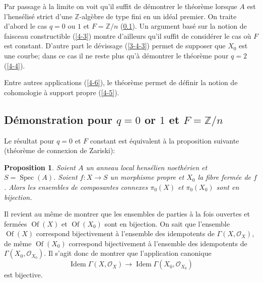 \documentclass{article}
\DeclareMathOperator{\spec}{Spec}
\newcommand{\cO}{\mathcal{O}}
\newcommand{\dZ}{\mathbb{Z}}
\newtheorem{proposition}[subsubsection]{Proposition}
\begin{document}
Par passage à la limite on voit qu'il suffit de démontrer le théorème 
lorsque $A$ est l'hensélisé strict d'une $\dZ$-algèbre  de type fini en 
un idéal premier. On traite d'abord le cas $q=0$ ou $1$ et $F=\dZ/n$ 
(\ref{4-2}). Un argument basé sur la notion de faisceau constructible 
(\ref{4-3}) montre d'ailleurs qu'il suffit de considérer le cas où $F$ est 
constant. D'autre part le dévissage (\ref{3-4-3}) permet de supposer que 
$X_0$ est une courbe; dans ce cas il ne reste plus qu'à démontrer le 
théorème pour $q=2$ (\ref{4-4}). 

Entre autres applications (\ref{4-6}), le théorème permet de définir la notion 
de cohomologie à support propre (\ref{4-5}). 










\subsection{Démonstration pour \texorpdfstring{$q=0$}{q=1} or \texorpdfstring{$1$}{1} et \texorpdfstring{$F=\dZ/n$}{F=Z/n}}\label{4-2} 

Le résultat pour $q=0$ et $F$ constant est équivalent à la proposition 
suivante (théorème de connexion de Zariski):





\begin{proposition}\label{4-2-1}
Soient $A$ un anneau local hensélien noethérien et $S=\spec(A)$. 
Soient $f:X\to S$ un morphisme propre et $X_0$ la fibre fermée de $f$. Alors 
les ensembles de composantes connexes $\pi_0(X)$ et $\pi_0(X_0)$ sont en 
bijection.
\end{proposition}

Il revient au même de montrer que les ensembles de parties à la fois 
ouvertes et fermées $\operatorname{Of}(X)$ et $\operatorname{Of}(X_0)$ sont 
en bijection. On sait que l'ensemble $\operatorname{Of}(X)$ correspond 
bijectivement à l'ensemble des idempotents de $\Gamma(X,\cO_X)$, de même 
$\operatorname{Of}(X_0)$ correspond bijectivement à l'ensemble des 
idempotents de $\Gamma(X_0,\cO_{X_0})$. Il s'agit donc de montrer que 
l'application canonique 
\[
  \operatorname{Idem} \Gamma(X,\cO_X) \to \operatorname{Idem}\Gamma(X_0,\cO_{X_0})
\]
est bijective. 
\end{document}
